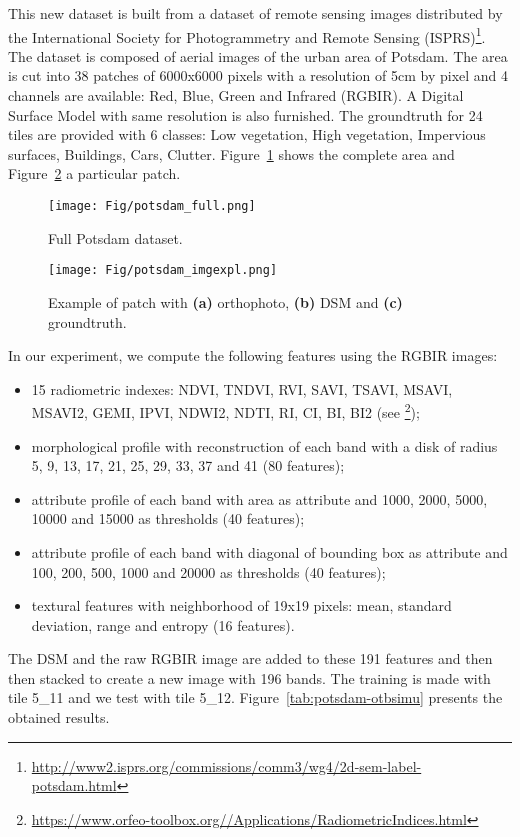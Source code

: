\documentclass[a4paper,11pt,DIV=16,abstracton]{scrartcl}
\begin{document}
    This new dataset is built from a dataset of remote sensing images distributed by the International Society for Photogrammetry and Remote Sensing (ISPRS)\footnote{\url{http://www2.isprs.org/commissions/comm3/wg4/2d-sem-label-potsdam.html}}. The dataset is composed of aerial images of the urban area of Potsdam. The area is cut into 38 patches of 6000x6000 pixels with a resolution of 5cm by pixel and 4 channels are available: Red, Blue, Green and Infrared (RGBIR). A Digital Surface Model with same resolution is also furnished. The groundtruth for 24 tiles are provided with 6 classes: Low vegetation, High vegetation, Impervious surfaces, Buildings, Cars, Clutter. Figure~\ref{fig:potsdam-dataset} shows the complete area and Figure~\ref{fig:potsdam-expl} a particular patch.

    \begin{figure}[!ht]
        \centering
        \texttt{[image: Fig/potsdam\_full.png]}
        \caption{Full Potsdam dataset.\label{fig:potsdam-dataset}}
    \end{figure}

    \begin{figure}[!ht]
        \centering
        \texttt{[image: Fig/potsdam\_imgexpl.png]}
        \caption{Example of patch with {\bfseries{(a)}} orthophoto, {\bfseries{(b)}} DSM and {\bfseries{(c)}} groundtruth.\label{fig:potsdam-expl}}
    \end{figure}

    In our experiment, we compute the following features using the RGBIR images:
    \begin{itemize}
        \item 15 radiometric indexes: NDVI, TNDVI, RVI, SAVI, TSAVI, MSAVI, MSAVI2, GEMI, IPVI, NDWI2, NDTI, RI, CI, BI, BI2 (see \footnote{\url{https://www.orfeo-toolbox.org//Applications/RadiometricIndices.html}});
        \item morphological profile with reconstruction of each band with a disk of radius 5, 9, 13, 17, 21, 25, 29, 33, 37 and 41 (80 features)\cite{tuia2015multiclass};
        \item attribute profile of each band with area as attribute and 1000, 2000, 5000, 10000 and 15000 as thresholds (40 features)\cite{tuia2015multiclass};
        \item attribute profile of each band with diagonal of bounding box as attribute and 100, 200, 500, 1000 and 20000 as thresholds (40 features)\cite{tuia2015multiclass};
        \item textural features with neighborhood of 19x19 pixels: mean, standard deviation, range and entropy (16 features)\cite{tuia2015multiclass}.
    \end{itemize}
    The DSM and the raw RGBIR image are added to these 191 features and then then stacked to create a new image with 196 bands. The training is made with tile 5\_11 and we test with tile 5\_12. Figure~\ref{tab:potsdam-otbsimu} presents the obtained results.
\end{document}
